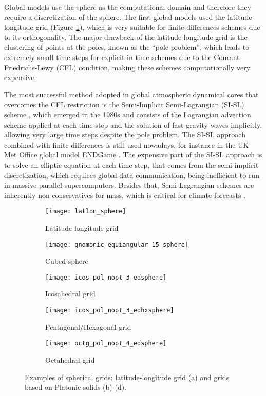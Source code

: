 Global models use the sphere as the computational domain and therefore they require a discretization
of the sphere. 
The first global models used the latitude-longitude grid (Figure \ref{latlon-grid}), which is
very suitable for finite-differences schemes due to its orthogonality. The major drawback of the latitude-longitude grid
is the clustering of points at the poles, known as the ``pole problem'', which leads to extremely
small time steps for explicit-in-time schemes due to the Courant-Friedrichs-Lewy (CFL) condition, 
making these schemes computationally very expensive.

The most successful method adopted in global atmospheric dynamical cores that overcomes the CFL 
restriction is the Semi-Implicit Semi-Lagrangian (SI-SL) scheme \citep{randall:2018}, which 
emerged in the 1980s and consists of the Lagrangian advection scheme applied at each time-step 
and the solution of fast gravity waves implicitly, allowing very large time steps despite the pole problem.
The SI-SL approach combined with finite differences is still used nowadays, for instance in 
the UK Met Office global model ENDGame \citep{wood:2014, benacchio:2016}.
The expensive part of the  SI-SL approach is to solve an elliptic equation at each time step,
that comes from the semi-implicit discretization, which requires global data communication,
being inefficient to run in massive parallel supercomputers. Besides that, 
Semi-Lagrangian schemes are inherently non-conservatives for mass,
which is critical for climate forecasts \citep{will:2007}.

\begin{figure}
  \centering
  \begin{subfigure}{.3\linewidth}
    \centering
    \texttt{[image: latlon\_sphere]}
      \caption{Latitude-longitude grid}\label{latlon-grid}
  \end{subfigure}%
  \hspace{1em}%
  \begin{subfigure}{.3\linewidth}
    \centering
    \texttt{[image: gnomonic\_equiangular\_15\_sphere]}
      \caption{Cubed-sphere}\label{cs-grid}
  \end{subfigure}%
  \hspace{2em}%
  \begin{subfigure}{.3\linewidth}
    \centering
    \texttt{[image: icos\_pol\_nopt\_3\_edsphere]}
	  \caption{Icosahedral grid}\label{icos-grid}
  \end{subfigure}
  \begin{subfigure}{.3\linewidth}
    \centering
    \texttt{[image: icos\_pol\_nopt\_3\_edhxsphere]}
	  \caption{Pentagonal/Hexagonal grid}\label{voronoi-grid}
  \end{subfigure}
  \begin{subfigure}{.3\linewidth}
    \centering
    \texttt{[image: octg\_pol\_nopt\_4\_edsphere]}
	  \caption{Octahedral grid}\label{octg-grid}
  \end{subfigure}
  \caption{Examples of spherical grids: latitude-longitude grid (a) and grids based on Platonic solids (b)-(d).}
\end{figure}


